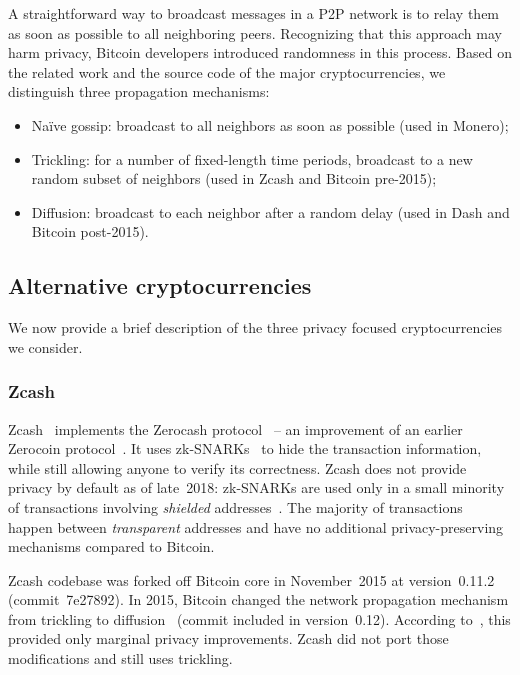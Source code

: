 A straightforward way to broadcast messages in a P2P network is to relay them as soon as possible to all neighboring peers.
Recognizing that this approach may harm privacy, Bitcoin developers introduced randomness in this process.
Based on the related work and the source code of the major cryptocurrencies, we distinguish three propagation mechanisms:
\begin{itemize}
	\item Na{\"i}ve gossip: broadcast to all neighbors as soon as possible (used in Monero);
	\item Trickling: for a number of fixed-length time periods, broadcast to a new random subset of neighbors (used in Zcash and Bitcoin pre-2015);
	\item Diffusion: broadcast to each neighbor after a random delay (used in Dash and Bitcoin post-2015).
\end{itemize}


\subsection{Alternative cryptocurrencies}

We now provide a brief description of the three privacy focused cryptocurrencies we consider.

\subsubsection{Zcash}

Zcash~\cite{Zcash} implements the Zerocash protocol~\cite{BenSasson2014, Hopwood2020} -- an improvement of an earlier Zerocoin protocol~\cite{Miers2013}.
It uses zk-SNARKs~\cite{BenSasson2014a} to hide the transaction information, while still allowing anyone to verify its correctness.
Zcash does not provide privacy by default as of late~2018: zk-SNARKs are used only in a small minority of transactions involving \textit{shielded} addresses~\cite{Kappos2018}.
The majority of transactions happen between \textit{transparent} addresses and have no additional privacy-preserving mechanisms compared to Bitcoin.

Zcash codebase was forked off Bitcoin core in November~2015 at version~0.11.2 (commit~7e27892).
In 2015, Bitcoin changed the network propagation mechanism from trickling to diffusion~\cite{Wuille} (commit included in version~0.12).
According to~\cite{Fanti2017}, this provided only marginal privacy improvements.
Zcash did not port those modifications and still uses trickling.

